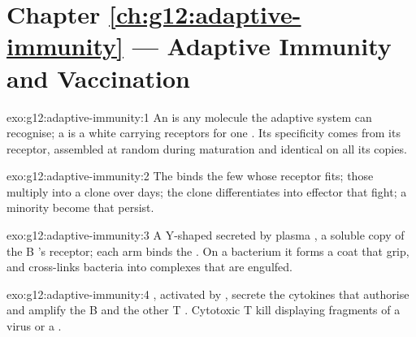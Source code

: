 \section*{Chapter \ref{ch:g12:adaptive-immunity} --- Adaptive Immunity and Vaccination}

\begin{solution}{exo:g12:adaptive-immunity:1}
An  is any molecule the adaptive system can recognise; a
 is a white  carrying receptors for one . Its
specificity comes from its receptor, assembled at random during
maturation and identical on all its copies.
\end{solution}

\begin{solution}{exo:g12:adaptive-immunity:2}
The  binds the few  whose receptor fits; those 
multiply into a clone over days; the clone differentiates into
effector  that fight; a minority become  that
persist.
\end{solution}

\begin{solution}{exo:g12:adaptive-immunity:3}
A Y-shaped  secreted by plasma , a soluble copy of the B
's receptor; each arm binds the . On a bacterium it forms
a coat that  grip, and cross-links bacteria into complexes
that are engulfed.
\end{solution}

\begin{solution}{exo:g12:adaptive-immunity:4}
, activated by , secrete the cytokines
that authorise and amplify the B  and the other T .
Cytotoxic T  kill  displaying fragments of a virus or a
 .
\end{solution}


